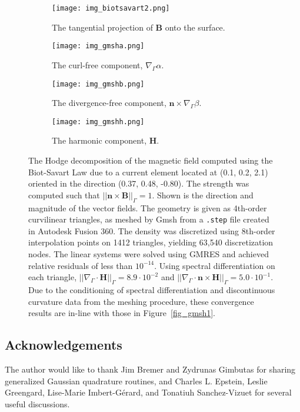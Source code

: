 \documentclass[11pt]{article}
\newcommand{\surfdiv}{\nabla_\Gamma \cdot}
\newcommand{\surfgrad}{\nabla_\Gamma}
\newcommand{\bn}{\bm n}
\newcommand{\bB}{\bm B}
\newcommand{\bH}{\bm H}
\numberwithin{equation}{section}
\begin{document}
\begin{figure}[!t]
  \begin{center}
    \begin{subfigure}[b]{.45\linewidth}
      \centering
      \texttt{[image: img\_biotsavart2.png]}
      \caption{The tangential projection of $\bB$ onto the surface.}
      \label{fig_torus_biot}
    \end{subfigure}
    \quad
    \begin{subfigure}[b]{.45\linewidth}
      \centering
      \texttt{[image: img\_gmsha.png]}
      \caption{The curl-free component, $\surfgrad \alpha$.}
      \label{fig_torusa}
    \end{subfigure}
    \begin{subfigure}[b]{.45\linewidth}
      \centering
      \texttt{[image: img\_gmshb.png]}
      \caption{The divergence-free component, $\bn \times \surfgrad
        \beta$.}
      \label{fig_torusb}
    \end{subfigure}
    \quad
    \begin{subfigure}[b]{.45\linewidth}
      \centering
      \texttt{[image: img\_gmshh.png]}
      \caption{The harmonic component, $\bH$.}
      \label{fig_torush}
    \end{subfigure}
    \caption{The Hodge decomposition of the magnetic field computed
      using the Biot-Savart Law due to a current element located at
      (0.1, 0.2, 2.1) oriented in the direction (0.37, 0.48, -0.80). The
      strength was computed such that $||\bn \times \bB||_\Gamma = 1$.
      Shown is the direction and magnitude of the vector fields.  The
      geometry is given as 4th-order curvilinear triangles, as meshed
      by Gmsh from a \texttt{.step} file created in Autodesk Fusion
      360. The density was discretized using 8th-order interpolation
      points on 1412 triangles, yielding 63,540 discretization
      nodes. The linear systems were solved using GMRES and achieved
      relative residuals of less than $10^{-14}$. Using spectral
      differentiation on each triangle,
      $||\surfdiv \bH||_\Gamma = 8.9 \cdot 10^{-2}$ and
      $||\surfdiv \bn \times \bH||_\Gamma = 5.0 \cdot 10^{-1}$. Due to the
      conditioning of spectral differentiation and discontinuous
      curvature data from the meshing procedure, these convergence
      results are in-line with those in Figure~\ref{fig_gmsh1}.}
    \label{fig_gmsh_harm}
  \end{center}
\end{figure}






\subsection*{Acknowledgements}
\label{sec_ack}

The author would like to thank Jim Bremer and Zydrunas Gimbutas for
sharing generalized Gaussian quadrature routines, and Charles
L. Epstein, Leslie Greengard, Lise-Marie Imbert-G\'erard, and 
Tonatiuh Sanchez-Vizuet
for several useful discussions.





\end{document}
